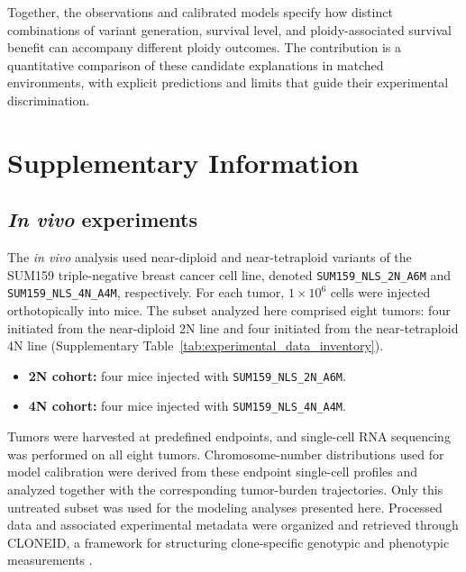 \documentclass[11pt]{article}
\let\cite\supercite
\begin{document}
Together, the observations and calibrated models specify how distinct combinations of variant generation, survival level, and ploidy-associated survival benefit can accompany different ploidy outcomes. The contribution is a quantitative comparison of these candidate explanations in matched environments, with explicit predictions and limits that guide their experimental discrimination.

\section{Supplementary Information}


\renewcommand{\figurename}{Supplementary Figure}
\setcounter{figure}{0}
\renewcommand{\tablename}{Supplementary Table}
\setcounter{table}{0}

\subsection{\textit{In vivo} experiments}
\label{invivo}

The \textit{in vivo} analysis used near-diploid and near-tetraploid variants of the SUM159 triple-negative breast cancer cell line, denoted \texttt{SUM159\_NLS\_2N\_A6M} and \texttt{SUM159\_NLS\_4N\_A4M}, respectively. For each tumor, $1 \times 10^6$ cells were injected orthotopically into mice. The subset analyzed here comprised eight tumors: four initiated from the near-diploid 2N line and four initiated from the near-tetraploid 4N line (Supplementary Table~\ref{tab:experimental_data_inventory}).

\begin{itemize}
\item \textbf{2N cohort:} four mice injected with \texttt{SUM159\_NLS\_2N\_A6M}.
\item \textbf{4N cohort:} four mice injected with \texttt{SUM159\_NLS\_4N\_A4M}.
\end{itemize}

Tumors were harvested at predefined endpoints, and single-cell RNA sequencing was performed on all eight tumors. Chromosome-number distributions used for model calibration were derived from these endpoint single-cell profiles and analyzed together with the corresponding tumor-burden trajectories. Only this untreated subset was used for the modeling analyses presented here. Processed data and associated experimental metadata were organized and retrieved through CLONEID, a framework for structuring clone-specific genotypic and phenotypic measurements \cite{veith_cloneid_2025}.
\end{document}
